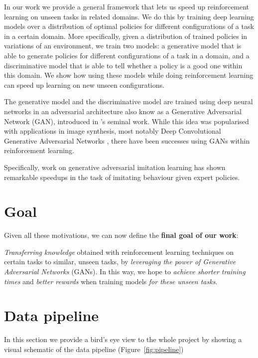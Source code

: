 In our work we provide a general framework that lets us speed up reinforcement learning on unseen tasks in related domains. We do this by training deep learning models over a distribution of optimal policies for different configurations of a task in a certain domain. More specifically, given a distribution of trained policies in variations of an environment, we train two models: a generative model that is able to generate policies for different configurations of a task in a domain, and a discriminative model that is able to tell whether a policy is a good one within this domain. We show how using these models while doing reinforcement learning can speed up learning on new unseen configurations.

The generative model and the discriminative model are trained using deep neural networks in an adversarial architecture also know as a Generative Adversarial Network (GAN), introduced in \cite{goodfellow2014generative}'s seminal work. While this idea was popularised with applications in image synthesis, most notably Deep Convolutional Generative Adversarial Networks \parencite{radford2015unsupervised}, there have been successes using GANs within reinforcement learning.

Specifically, work on generative adversarial imitation learning \parencite{ho2016generative} has shown remarkable speedups in the task of imitating behaviour given expert policies.

\section{Goal}
\label{goal}
Given all these motivations, we can now define the \textbf{final goal of our work}: \\

\begin{addmargin}[3em]{3em}
\emph{Transferring knowledge} obtained with reinforcement learning techniques on certain tasks to similar, unseen tasks, by \emph{leveraging the power of Generative Adversarial Networks} (GANs). In this way, we hope to \emph{achieve shorter training times} and \emph{better rewards} when training models \emph{for these unseen tasks}.
\end{addmargin}


\section{Data pipeline}
\label{sec:datapipeline}
In this section we provide a bird's eye view to the whole project by showing a visual schematic of the data pipeline (Figure~\ref{fig:pipeline})

